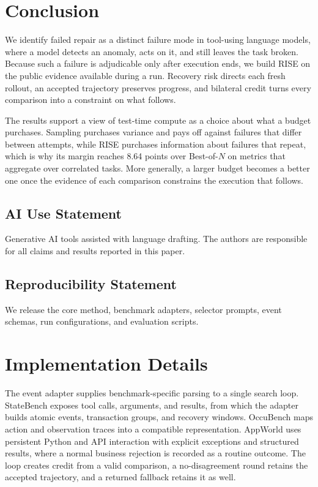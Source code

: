 \documentclass{article}
\newcommand{\method}{RISE\xspace}
\begin{document}
\section{Conclusion}
We identify failed repair as a distinct failure mode in tool-using language models, where a model detects an anomaly, acts on it, and still leaves the task broken. Because such a failure is adjudicable only after execution ends, we build \method on the public evidence available during a run. Recovery risk directs each fresh rollout, an accepted trajectory preserves progress, and bilateral credit turns every comparison into a constraint on what follows.

The results support a view of test-time compute as a choice about what a budget purchases. Sampling purchases variance and pays off against failures that differ between attempts, while \method purchases information about failures that repeat, which is why its margin reaches 8.64 points over \mbox{Best-of-$N$} on metrics that aggregate over correlated tasks. More generally, a larger budget becomes a better one once the evidence of each comparison constrains the execution that follows.

\subsection*{AI Use Statement}
Generative AI tools assisted with language drafting. The authors are responsible for all claims and results reported in this paper.

\subsection*{Reproducibility Statement}
We release the core method, benchmark adapters, selector prompts, event schemas, run configurations, and evaluation scripts.




\appendix
\section{Implementation Details}
\label{app:implementation}
The event adapter supplies benchmark-specific parsing to a single search loop. StateBench exposes tool calls, arguments, and results, from which the adapter builds atomic events, transaction groups, and recovery windows. OccuBench maps action and observation traces into a compatible representation. AppWorld uses persistent Python and API interaction with explicit exceptions and structured results, where a normal business rejection is recorded as a routine outcome. The loop creates credit from a valid comparison, a no-disagreement round retains the accepted trajectory, and a returned fallback retains it as well.
\end{document}

